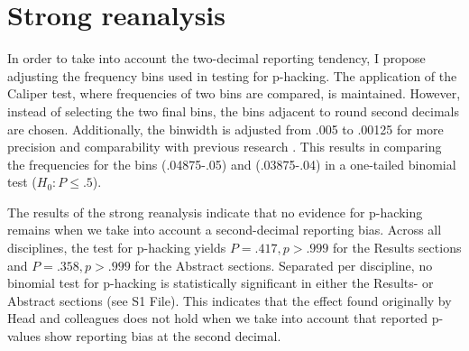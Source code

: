 \section*{Strong reanalysis}
In order to take into account the two-decimal reporting tendency, I propose adjusting the frequency bins used in testing for p-hacking. The application of the Caliper test, where frequencies of two bins are compared, is maintained. However, instead of selecting the two final bins, the bins adjacent to round second decimals are chosen. Additionally, the binwidth is adjusted from .005 to .00125 for more precision and comparability with previous research \cite{Masicampo2012, Leggett2013}. This results in comparing the frequencies for the bins (.04875-.05) and (.03875-.04) in a one-tailed binomial test ($H_0: P \leq .5$).

The results of the strong reanalysis indicate that no evidence for p-hacking remains when we take into account a second-decimal reporting bias. Across all disciplines, the test for p-hacking yields $P=.417,p>.999$ for the Results sections and $P=.358,p>.999$ for the Abstract sections. Separated per discipline, no binomial test for p-hacking is statistically significant in either the Results- or Abstract sections (see S1 File). This indicates that the effect found originally by Head and colleagues does not hold when we take into account that reported p-values show reporting bias at the second decimal.